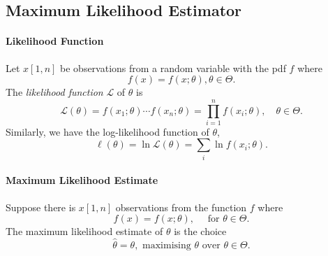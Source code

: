 \subsection{Maximum Likelihood Estimator}

\paragraph{Likelihood Function}
Let \(x[1, n]\) be observations from a random variable with the pdf \(f\)
where  \[
  f(x) = f(x; \theta), \theta \in \Theta
.\] The \textit{likelihood function} \(\mathcal{L}\) of \(\theta\) is \[
  \mathcal{L}(\theta) = f(x_1; \theta) \cdots f(x_n; \theta)
  = \prod_{i = 1}^n f(x_i; \theta), \quad \theta \in \Theta
.\] 
Similarly, we have the log-likelihood function of \(\theta\), \[
  \ell(\theta) = \ln{\mathcal{L}(\theta)} = \sum_i \ln{f(x_i; \theta)}
.\] 

\paragraph{Maximum Likelihood Estimate}
Suppose there is \(x[1, n]\) observations from the function \(f\) where \[
  f(x) = f(x; \theta), \quad \text{ for } \theta \in  \Theta
.\]
The maximum likelihood estimate of \(\theta\) is the choice \[
  \hat{\theta} = \theta, \text{ maximising } \mathcal{\theta} \text{ over } \theta \in \Theta
.\] 


